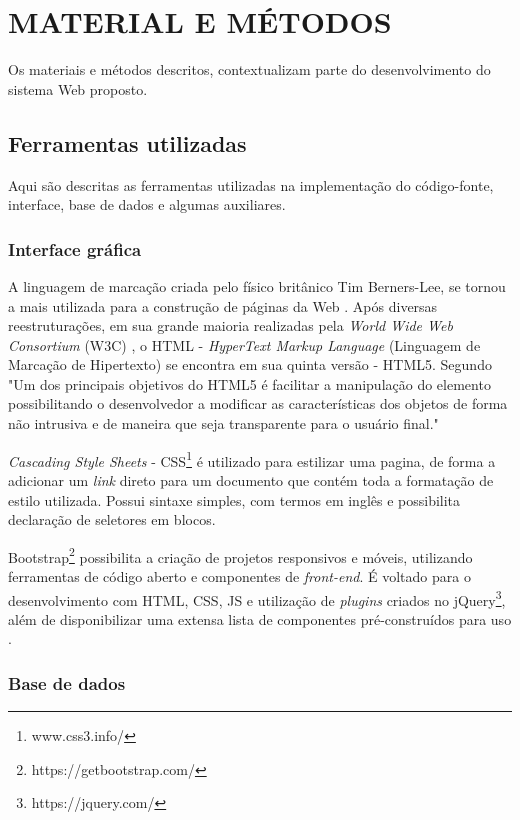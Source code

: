 \chapter{MATERIAL E MÉTODOS}
\label{cap:desenvolvimento}

Os materiais e métodos descritos, contextualizam parte do desenvolvimento do sistema Web proposto.

\section{Ferramentas utilizadas}

Aqui são descritas as ferramentas utilizadas na implementação do código-fonte, interface, base de dados e algumas auxiliares.

\subsection{Interface gráfica}
A linguagem de marcação criada pelo físico britânico Tim Berners-Lee, se tornou a mais utilizada para a construção de páginas da Web \cite{doi:10.1080/02763869.2011.540212}. Após diversas reestruturações, em sua grande maioria realizadas pela \textit{World Wide Web Consortium} (W3C) , o HTML - \textit{HyperText Markup Language} (Linguagem de Marcação de Hipertexto) se encontra em sua quinta versão - HTML5.  Segundo \cite{curso2010html5} "Um dos principais objetivos do HTML5 é facilitar a manipulação do elemento possibilitando o
desenvolvedor a modificar as características dos objetos de forma não intrusiva e de maneira que
seja transparente para o usuário final."

\textit{Cascading Style Sheets} - CSS\footnote{www.css3.info/}  é utilizado para estilizar uma pagina, de forma a adicionar um \textit{link} direto para um documento que contém toda a formatação de estilo utilizada. Possui sintaxe simples, com termos em inglês e possibilita declaração de seletores em blocos.

Bootstrap\footnote{https://getbootstrap.com/} possibilita a criação de projetos responsivos e móveis, utilizando ferramentas de código aberto e componentes de \textit{front-end}. É voltado para o desenvolvimento com HTML, CSS, JS e utilização de \textit{plugins} criados no jQuery\footnote{https://jquery.com/}, além de disponibilizar uma extensa lista de componentes pré-construídos para uso \cite{spurlock2013bootstrap}.

\subsection{Base de dados}

